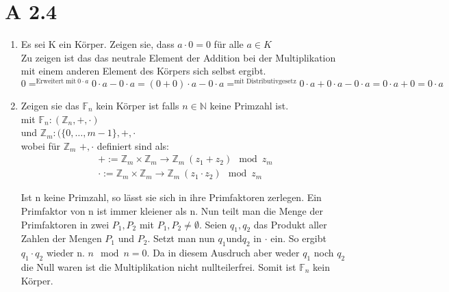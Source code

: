 \documentclass{article}
\begin{document}
        \section*{A 2.4}
            \begin{enumerate}[label= (\roman*)]
                \item Es sei K ein Körper. Zeigen sie, dass \(a \cdot 0 = 0\) für alle \(a \in K\)\\
                Zu zeigen ist das das neutrale Element der Addition bei der Multiplikation mit einem anderen Element des Körpers sich selbst ergibt.
                \begin{equation*}
                    0 =^{\text{Erweitert mit} \: 0 \cdot a} 0 \cdot a - 0 \cdot a = (0+0) \cdot a - 0 \cdot a =^{\text{mit Distributivgesetz}} 0 \cdot a + 0 \cdot a - 0 \cdot a
                    = 0 \cdot a + 0 = 0 \cdot a
                \end{equation*}

                \item Zeigen sie das \(\mathbb{F}_n\) kein Körper ist falls \(n \in \mathbb{N}\) keine Primzahl ist. \\
                mit \(\mathbb{F}_n: (\mathbb{Z}_n, +, \cdot) \) \\
                und \(\mathbb{Z}_m: (\{0, \dots, m-1\}, +, \cdot \) \\
                wobei für \(\mathbb{Z}_m\) \(+, \cdot \) definiert sind als: \\
                \begin{align*}
                    + := \mathbb{Z}_m \times \mathbb{Z}_m \to \mathbb{Z}_m \: (z_1 + z_2) \mod z_m \\
                    \cdot := \mathbb{Z}_m \times \mathbb{Z}_m \to \mathbb{Z}_m \: (z_1 \cdot z_2) \mod z_m
                \end{align*}
                

                Ist n keine Primzahl, so lässt sie sich in ihre Primfaktoren zerlegen. Ein Primfaktor von n ist immer kleiener als n.
                Nun teilt man die Menge der Primfaktoren in zwei \(P_1, P_2\) mit \(P_1, P_2 \neq \emptyset \). Seien \(q_1, q_2\) das Produkt aller Zahlen
                der Mengen \(P_1\) und \(P_2\). Setzt man nun \(q_1 \text{und} q_2\) in \(\cdot \) ein. So ergibt \(q_1 \cdot q_2\) wieder n. \(n \mod n = 0\).
                Da in diesem Ausdruch aber weder \(q_1\) noch \(q_2\) die Null waren ist die Multiplikation nicht nullteilerfrei.
                Somit ist \(\mathbb{F}_n\) kein Körper.
                

\end{enumerate}
\end{document}
